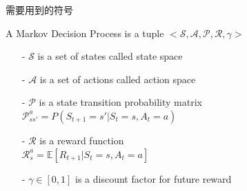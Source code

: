 \begin{emp_box}
需要用到的符号

A Markov Decision Process is a tuple $<\mathcal{S}, \mathcal{A}, \mathcal{P}, 
\mathcal{R}, \gamma>$
\begin{itemize}
\setlength{\parskip}{0pt}
\item[-]
$\mathcal{S}$ is a set of states called state space

\item[-]
$\mathcal{A}$ is a set of actions called action space

\item[-]
$\mathcal{P}$ is a state transition probability matrix \\
$\mathcal{P}^a_{ss'}=P(S_{t+1}=s'|S_t=s,A_t=a)$

\item[-]
$\mathcal{R}$ is a reward function \\
$ \mathcal{R}^a_s=\mathbb{E}\left[R_{t+1}|S_t=s,A_t=a\right]$

\item[-]
$\gamma\in[0, 1]$ is a discount factor for future reward
\end{itemize}

\end{emp_box}

